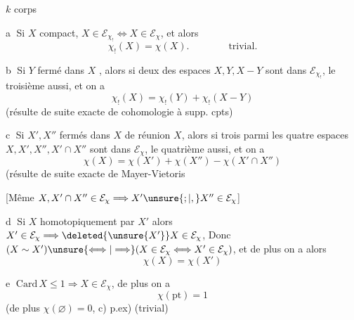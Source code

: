 $k$ corps

\textcircled{a}  Si $X$ compact, $X\in\mathcal E_{\chi_!}\Longleftrightarrow X\in\mathcal E_{\chi}$, et alors
\[
\chi_!(X)=\chi(X).\qquad\qquad\text{trivial.}
\]

\textcircled{b} Si $Y$ fermé dans $X$ , alors si deux des espaces $X,Y,X-Y$
sont dans $\mathcal E_{\chi_!}$, le troisième aussi, et on a
\[
\chi_!(X)=\chi_!(Y)+\chi_!(X-Y)
\]
(résulte de suite exacte de cohomologie à supp. cpts)

\textcircled{c} Si $X',X''$  fermés dans $X$ de réunion $X$, alors si trois
parmi les quatre espaces $X,X',X'',X'\cap X''$ sont dans
$\mathcal E_{\chi}$, le quatrième aussi, et on a
\[
\chi(X)=\chi(X')+\chi(X'')-\chi(X'\cap X'')
\]
(résulte de suite exacte de Mayer-Vietoris

 [Même $X,X'\cap X''\in\mathcal E_{\chi}\Longrightarrow X'\unsure{;|,}X''\in\mathcal E_{\chi}$]

\textcircled{d} Si $X$  homotopiquement par $X'$
alors $X'\in\mathcal E_{\chi}\Longrightarrow\deleted{\unsure{X'}}X\in\mathcal E_{\chi}$, Donc
$(X\sim X')\unsure{\Longleftrightarrow|\Longrightarrow}(X\in\mathcal E_{\chi}\Longleftrightarrow X'\in\mathcal E_{\chi})$, et de plus
on a alors
\[
\chi(X)=\chi(X')
\]

\textcircled{e}  $\mathrm{Card}\,X\leq1\Longrightarrow X\in\mathcal E_{\chi}$, de
plus on a
\[
\chi(\mathrm{pt})=1
\]
(de plus $\chi(\varnothing)=0$,  c) p.ex) \qquad (trivial)

